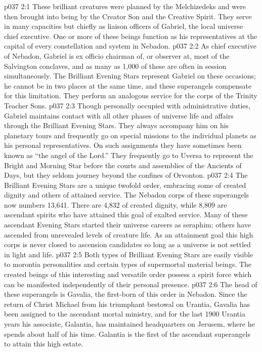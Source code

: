 \vs p037 2:1 These brilliant creatures were planned by the Melchizedeks and were then brought into being by the Creator Son and the Creative Spirit. They serve in many capacities but chiefly as liaison officers of Gabriel, the local universe chief executive. One or more of these beings function as his representatives at the capital of every constellation and system in Nebadon.
\vs p037 2:2 As chief executive of Nebadon, Gabriel is ex officio chairman of, or observer at, most of the Salvington conclaves, and as many as 1,000 of these are often in session simultaneously. The Brilliant Evening Stars represent Gabriel on these occasions; he cannot be in two places at the same time, and these superangels compensate for this limitation. They perform an analogous service for the corps of the Trinity Teacher Sons.
\vs p037 2:3 Though personally occupied with administrative duties, Gabriel maintains contact with all other phases of universe life and affairs through the Brilliant Evening Stars. They always accompany him on his planetary tours and frequently go on special missions to the individual planets as his personal representatives. On such assignments they have sometimes been known as “the angel of the Lord.” They frequently go to Uversa to represent the Bright and Morning Star before the courts and assemblies of the Ancients of Days, but they seldom journey beyond the confines of Orvonton.
\vs p037 2:4 \pc The Brilliant Evening Stars are a unique twofold order, embracing some of created dignity and others of attained service. The Nebadon corps of these superangels now numbers 13,641. There are 4,832 of created dignity, while 8,809 are ascendant spirits who have attained this goal of exalted service. Many of these ascendant Evening Stars started their universe careers as seraphim; others have ascended from unrevealed levels of creature life. As an attainment goal this high corps is never closed to ascension candidates so long as a universe is not settled in light and life.
\vs p037 2:5 Both types of Brilliant Evening Stars are easily visible to morontia personalities and certain types of supermortal material beings. The created beings of this interesting and versatile order possess a spirit force which can be manifested independently of their personal presence.
\vs p037 2:6 \pc The head of these superangels is Gavalia, the first\hyp{}born of this order in Nebadon. Since the return of Christ Michael from his triumphant bestowal on Urantia, Gavalia has been assigned to the ascendant mortal ministry, and for the last 1900 Urantia years his associate, Galantia, has maintained headquarters on Jerusem, where he spends about half of his time. Galantia is the first of the ascendant superangels to attain this high estate.

